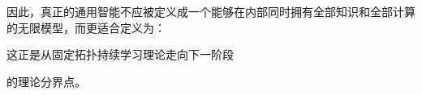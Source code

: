 因此，真正的通用智能不应被定义成一个能够在内部同时拥有全部知识和全部计算的无限模型，而更适合定义为：

\begin{statementbox}
\centering
{}
\end{statementbox}

这正是从固定拓扑持续学习理论走向下一阶段
\begin{statementbox}
\centering
{}
\end{statementbox}
的理论分界点。
